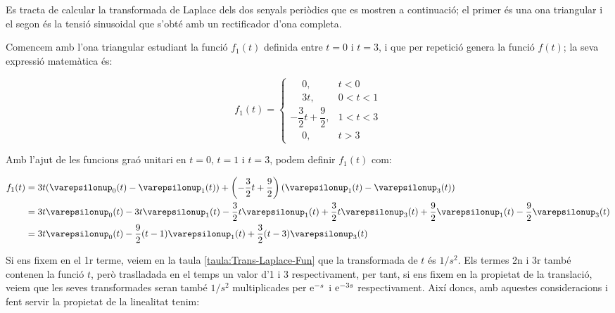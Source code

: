 	
\begin{exemple}[\CalcTransfLaplace{}]
	\addcontentsxms{\CalcTransfLaplace}
    Es tracta de calcular la transformada de Laplace dels dos
    senyals periòdics que es mostren a continuació; el primer és una
    ona triangular i el segon és la tensió sinusoidal que s'obté amb un
    rectificador d'ona completa.

    \begin{center}
        
    \end{center}

    Comencem amb l'ona triangular estudiant la funció $f_1(t)$ definida
    entre $t=0$ i $t=3$, i que per repetició genera la funció $f(t)$; la
    seva expressió matemàtica és:

    \[
        f_1(t) = \begin{cases}
        \phantom{-}0, & t < 0\\
        \phantom{-}3t, & 0<t<1 \\
        -\dfrac{3}{2}t +\dfrac{9}{2}, & 1 < t < 3 \\
        \phantom{-}0, & t > 3 \end{cases}
    \]

    Amb l'ajut de les funcions graó unitari en $t=0$, $t=1$ i $t=3$,
    podem definir $f_1(t)$ com:

    \[\begin{split}
        f_1(t) &= 3t (\varepsilonup_0(t) - \varepsilonup_1(t)) + \left(-\frac{3}{2}t
        +\frac{9}{2}\right) (\varepsilonup_1(t) -
        \varepsilonup_3(t))  \\
        &=
        3t\varepsilonup_0(t)-3t\varepsilonup_1(t)-\frac{3}{2}t \varepsilonup_1(t)
        +\frac{3}{2}t \varepsilonup_3(t) +\frac{9}{2} \varepsilonup_1(t)
        -\frac{9}{2} \varepsilonup_3(t)  \\
        &=3t\varepsilonup_0(t) -\frac{9}{2}(t-1)\varepsilonup_1(t) +
        \frac{3}{2}(t-3)\varepsilonup_3(t)
    \end{split}\]

    Si ens fixem en el 1r terme, veiem en la taula
    \vref{taula:Trans-Laplace-Fun} que la  transformada de $t$ és $1/s^2$.
    Els termes 2n i 3r també contenen la funció $t$, però traslladada
    en el temps un valor d'1 i 3 respectivament, per tant, si ens fixem
    en la propietat de la translació, veiem que les seves transformades
    seran també $1/s^2$ multiplicades per $\mathrm{e}^{-s}$ i $\mathrm{e}^{-3s}$
    respectivament. Així doncs, amb aquestes consideracions i fent
    servir la propietat de la linealitat tenim:


\end{exemple}
